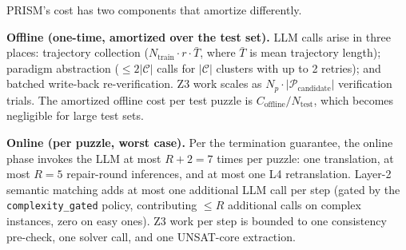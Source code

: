 PRISM's cost has two components that amortize differently.

\textbf{Offline (one-time, amortized over the test set).} LLM calls arise in three places: trajectory collection ($N_{\text{train}} \cdot r \cdot \bar{T}$, where $\bar{T}$ is mean trajectory length); paradigm abstraction ($\leq 2|\mathcal{C}|$ calls for $|\mathcal{C}|$ clusters with up to 2 retries); and batched write-back re-verification. Z3 work scales as $N_p \cdot |\mathcal{P}_{\text{candidate}}|$ verification trials. The amortized offline cost per test puzzle is $C_{\text{offline}} / N_{\text{test}}$, which becomes negligible for large test sets.

\textbf{Online (per puzzle, worst case).} Per the termination guarantee, the online phase invokes the LLM at most $R + 2 = 7$ times per puzzle: one translation, at most $R = 5$ repair-round inferences, and at most one L4 retranslation. Layer-2 semantic matching adds at most one additional LLM call per step (gated by the \texttt{complexity\_gated} policy, contributing $\leq R$ additional calls on complex instances, zero on easy ones). Z3 work per step is bounded to one consistency pre-check, one solver call, and one UNSAT-core extraction.
